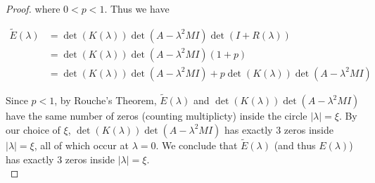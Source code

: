 \documentclass[thesis.tex]{subfiles}
\begin{document}
\begin{lemma}
\begin{proof}
where $0 < p < 1$. Thus we have

\begin{align*}
\tilde{E}(\lambda) &= \det(K(\lambda))\det(A - \lambda^2 MI)\det(I + R(\lambda)) \\
&= \det(K(\lambda))\det(A - \lambda^2 MI)(1 + p) \\
&= \det(K(\lambda))\det(A - \lambda^2 MI) + p \det(K(\lambda))\det(A - \lambda^2 MI)
\end{align*}

Since $p < 1$, by Rouche's Theorem, $\tilde{E}(\lambda)$ and $\det(K(\lambda))\det(A - \lambda^2 MI)$ have the same number of zeros (counting multiplicty) inside the circle $|\lambda| = \xi$. By our choice of $\xi$, $\det(K(\lambda))\det(A - \lambda^2 MI)$ has exactly 3 zeros inside $|\lambda| = \xi$, all of which occur at $\lambda = 0$. We conclude that $\tilde{E}(\lambda)$ (and thus $E(\lambda)$) has exactly 3 zeros inside $|\lambda| = \xi$.\\

\end{proof}
\end{lemma}



\end{document}
